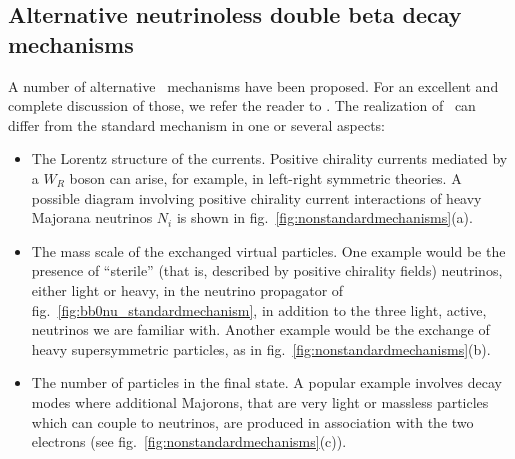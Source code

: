 \subsection{Alternative neutrinoless double beta decay mechanisms} \label{subsec:bb0nu_alternativemechanisms}
A number of alternative \bbonu\ mechanisms have been proposed. For an excellent and complete discussion of those, we refer the reader to \cite{Rodejohann:2011mu}. The realization of \bbonu\ can differ from the standard mechanism in one or several aspects:
%
\begin{itemize}
\item The Lorentz structure of the currents. Positive chirality currents mediated by a $W_R$ boson can arise, for example, in left-right symmetric theories. A possible diagram involving positive chirality current interactions of heavy Majorana neutrinos $N_i$ is shown in fig.~\ref{fig:nonstandardmechanisms}(a).
%
\item The mass scale of the exchanged virtual particles. One example would be the presence of ``sterile'' (that is, described by positive chirality fields) neutrinos, either light or heavy, in the neutrino propagator of fig.~\ref{fig:bb0nu_standardmechanism}, in addition to the three light, active, neutrinos we are familiar with. Another example would be the exchange of heavy supersymmetric particles, as in fig.~\ref{fig:nonstandardmechanisms}(b).
%
\item The number of particles in the final state. A popular example involves decay modes where additional Majorons, that are very light or massless particles which can couple to neutrinos, are produced in association with the two electrons (see fig.~\ref{fig:nonstandardmechanisms}(c)).
\end{itemize}
%
